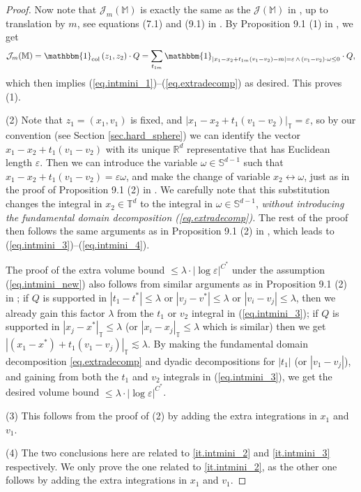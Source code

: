 \documentclass[10pt, reqno]{amsart}
\newcommand{\Mb}{\mathbb M}
\newcommand{\Rb}{\mathbb R}
\newcommand{\Sb}{\mathbb S}
\newcommand{\Tb}{\mathbb T}
\newcommand {\Jc}{\mathcal J}
\theoremstyle{definition}
\theoremstyle{remark}
\numberwithin{equation}{section}
\begin{document}
\begin{proof}
Now note that $\Jc_m(\Mb)$ is exactly the same as the $\Jc(\Mb)$ in \cite{DHM24}, up to translation by $m$, see equations (7.1) and (9.1) in \cite{DHM24}. By Proposition 9.1 (1) in \cite{DHM24}, we get
\begin{equation}\label{eq.proof_intmini_1_7}
    \Jc_m(\Mb)=\mathbbm{1}_{\mathrm{col}}\left(z_1, z_2\right) \cdot Q=\sum_{t_{1m}}\mathbbm{1}_{|x_1-x_2+t_{1m}(v_1-v_2) - m|=\varepsilon\,\wedge\,(v_1-v_2)\cdot\omega\leq 0}\cdot Q,
\end{equation} which then implies (\ref{eq.intmini_1})--(\ref{eq.extradecomp}) as desired. This proves (1).

(2) Note that $z_1=(x_1,v_1)$ is fixed, and $|x_1-x_2+t_1(v_1-v_2)|_\Tb=\varepsilon$, so by our convention (see Section \ref{sec.hard_sphere}) we can identify the vector $x_1-x_2+t_1(v_1-v_2)$ with its unique $\Rb^d$ representative that has Euclidean length $\varepsilon$. Then we can introduce the variable $\omega\in \Sb^{d-1}$ such that $x_1-x_2+t_1(v_1-v_2)=\varepsilon\omega$, and make the change of variable $x_2\leftrightarrow\omega$, just as in the proof of Proposition 9.1 (2) in \cite{DHM24}. We carefully note that this substitution changes the integral in $x_2\in\Tb^d$ to the integral in $\omega\in\Sb^{d-1}$, \emph{without introducing the fundamental domain decomposition (\ref{eq.extradecomp}).} The rest of the proof then follows the same arguments as in Proposition 9.1 (2) in \cite{DHM24}, which leads to (\ref{eq.intmini_3})--(\ref{eq.intmini_4}).

The proof of the extra volume bound $\leq \lambda\cdot|\log\varepsilon|^{C^*}$ under the assumption (\ref{eq.intmini_new}) also follows from similar arguments as in Proposition 9.1 (2) in \cite{DHM24}; if $Q$ is supported in $|t_1-t^*|\leq\lambda$ or $|v_j-v^*|\leq\lambda$ or $|v_i-v_j|\leq\lambda$, then we already gain this factor $\lambda$ from the $t_1$ or $v_2$ integral in (\ref{eq.intmini_3}); if $Q$ is supported in $|x_j-x^*|_\Tb\leq\lambda$ (or $|x_i-x_j|_\Tb\leq\lambda$ which is similar) then we get $|(x_1-x^*)+t_1(v_1-v_j)|_\Tb\lesssim\lambda$. By making the fundamental domain decomposition \eqref{eq.extradecomp} and dyadic decompositions for $|t_1|$ (or $|v_1-v_j|$), and gaining from both the $t_1$ and $v_2$ integrals in (\ref{eq.intmini_3}), we get the desired volume bound $\leq \lambda\cdot|\log\varepsilon|^{C^*}$.

(3) This follows from the proof of (2) by adding the extra integrations in $x_1$ and $v_1$.

(4) The two conclusions here are related to \eqref{it.intmini_2} and \eqref{it.intmini_3} respectively. We only prove the one related to \eqref{it.intmini_2}, as the other one follows by adding the extra integrations in $x_1$ and $v_1$.


\end{proof}
\end{document}
